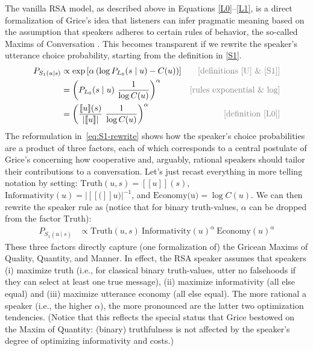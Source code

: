 \documentclass{sp}
\newcommand{\sem}[1]{\ensuremath{[\![#1]\!]}}
\begin{document}
The vanilla RSA model, as described above in Equations \eqref{L0}--\eqref{L1}, is a direct
formalization of Grice's idea that listeners can infer pragmatic meaning based on the
assumption that speakers adheres to certain rules of behavior, the so-called Maxims of
Conversation \citep{Grice1975:Logic-and-Conve}. This becomes transparent if we rewrite the
speaker's utterance choice probability, starting from the definition in \eqref{S1}. 
%
\begin{align} \label{eq:S1-rewrite}
  P_{S_1(u\mid s)} & \propto \exp \left [ \alpha \left (\log P_{L_0}(s \mid u) - C(u) \right)  \right ] & \text{\textcolor{gray}{[definitions \eqref{U} \& \eqref{S1}]}} \\
  & = \left (P_{L_0}(s \mid u) \  \frac{1}{\log C(u)} \right)^{\alpha} & \text{\textcolor{gray}{[rules exponential \& log]}} \nonumber \\
  & = \left ( \frac{\sem{u}(s)}{| \sem{u} |} \ \frac{1}{\log C(u)} \right )^{\alpha} & \text{\textcolor{gray}{[definition \eqref{L0}]}} \nonumber 
\end{align}
%
The reformulation in~\eqref{eq:S1-rewrite} shows how the speaker's choice probabilities are a
product of three factors, each of which corresponds to a central postulate of Grice's
concerning how cooperative and, arguably, rational speakers should tailor their contributions
to a conversation. Let's just recast everything in more telling notation by setting:
$\text{Truth}(u,s) = \sem{u}(s)$, $\text{Informativity}(u) = |\sem(u)|^{-1}$, and
$\text{Economy(u)} = \log C(u)$. We can then rewrite the speaker rule as (notice that for
binary truth-values, $\alpha$ can be dropped from the factor $\text{Truth}$):
\begin{align} \label{eq:S1-three-factor-formulation}
  P_{S_1(u\mid s)}   & \propto \text{Truth}(u,s) \ \text{Informativity}(u)^{\alpha} \ \text{Economy}(u)^{\alpha} %
\end{align}
These three factors directly capture (one formalization of) the Gricean Maxims of Quality,
Quantity, and Manner. In effect, the RSA speaker assumes that speakers (i) maximize truth
(i.e., for classical binary truth-values, utter no falsehoods if they can select at least one
true message), (ii) maximize informativity (all else equal) and (iii) maximize utterance
economy (all else equal). The more rational a speaker (i.e., the higher $\alpha$), the more
pronounced are the latter two optimization tendencies. (Notice that this reflects the special
status that Grice bestowed on the Maxim of Quantity: (binary) truthfulness is not affected by
the speaker's degree of optimizing informativity and costs.)
\end{document}
